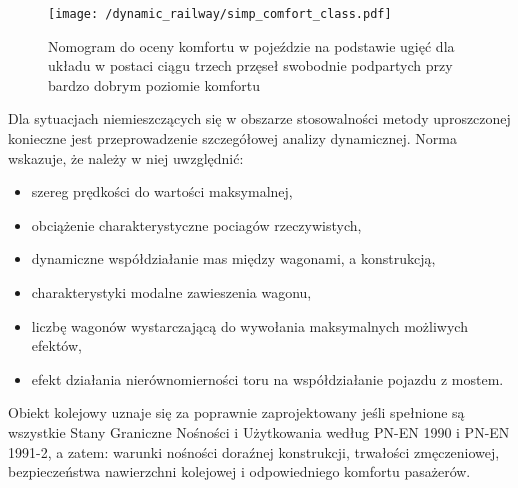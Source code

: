 \begin{figure}[hbt!]
	\centering
	\texttt{[image: /dynamic\_railway/simp\_comfort\_class.pdf]}
	\captionsetup{justification=centering}
	\caption{Nomogram do oceny komfortu w pojeździe na podstawie ugięć dla układu w postaci ciągu trzech przęseł swobodnie podpartych przy bardzo dobrym poziomie komfortu}
	\label{fig:simpl_comfort_clas}
\end{figure}

Dla sytuacjach niemieszczących się w obszarze stosowalności metody uproszczonej konieczne jest przeprowadzenie szczegółowej analizy dynamicznej. Norma wskazuje, że należy w niej uwzględnić:
\begin{itemize}
	\item szereg prędkości do wartości maksymalnej,
	\item obciążenie charakterystyczne pociagów rzeczywistych,
	\item dynamiczne współdziałanie mas między wagonami, a konstrukcją,
	\item charakterystyki modalne zawieszenia wagonu,
	\item liczbę wagonów wystarczającą do wywołania maksymalnych możliwych efektów,
	\item efekt działania nierównomierności toru na współdziałanie pojazdu z mostem.
\end{itemize}

Obiekt kolejowy uznaje się za poprawnie zaprojektowany jeśli spełnione są wszystkie Stany Graniczne Nośności i Użytkowania według PN-EN 1990 i PN-EN 1991-2, a zatem: warunki nośności doraźnej konstrukcji, trwałości zmęczeniowej, bezpieczeństwa nawierzchni kolejowej i odpowiedniego komfortu pasażerów.

